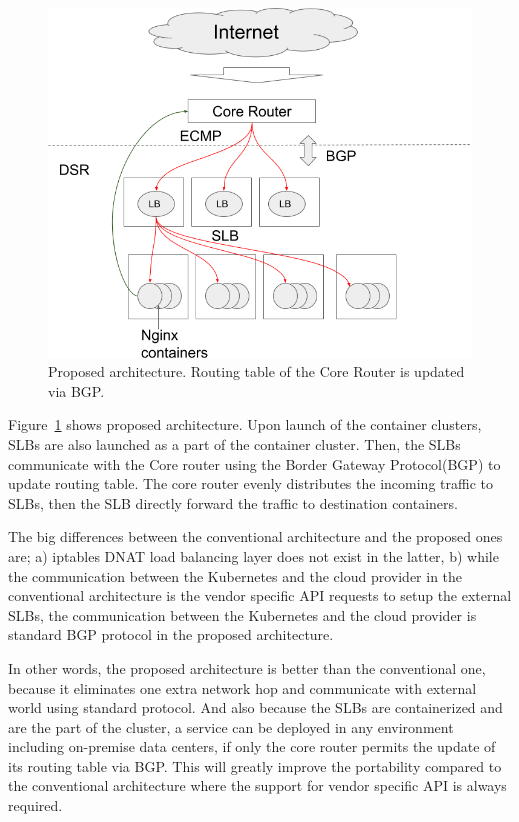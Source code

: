 \begin{figure}
\includegraphics[width=\columnwidth]{Figs/new_lb}
\caption{Proposed architecture. Routing table of the Core Router is updated via BGP.}
\label{fig:new_lb}
\end{figure}

Figure~\ref{fig:new_lb} shows proposed architecture.
Upon launch of the container clusters, SLBs are also launched as a part of the container cluster.
Then, the SLBs communicate with the Core router using the Border Gateway Protocol(BGP)\cite{rekhter2005border} to update routing table.
The core router evenly distributes the incoming traffic to SLBs, then the SLB directly forward the traffic to destination containers.

The big differences between the conventional architecture and the proposed ones are;
a) iptables DNAT load balancing layer does not exist in the latter,
b) while the communication between the Kubernetes and the cloud provider in the conventional architecture is the vendor specific API requests to setup the external SLBs, the communication between the Kubernetes and the cloud provider is standard BGP protocol in the proposed architecture.

In other words, the proposed architecture is better than the conventional one, because it eliminates one extra network hop and communicate with external world using standard protocol.
And also because the SLBs are containerized and are the part of the cluster, a service can be deployed in any environment including on-premise data centers, if only the core router permits the update of its routing table via BGP.
This will greatly improve the portability compared to the conventional architecture where the support for vendor specific API is always required.

